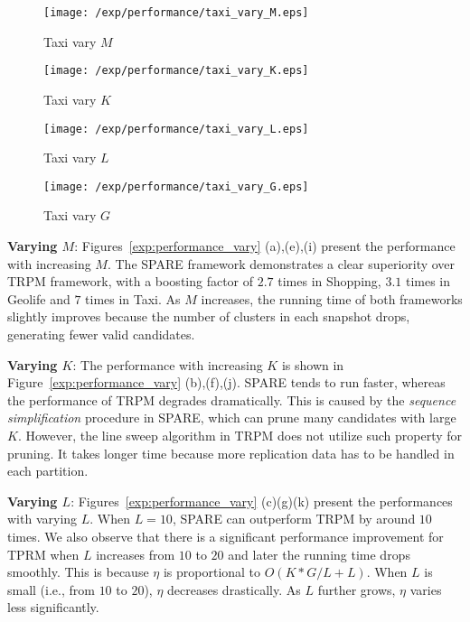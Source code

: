 \begin{figure*}[t]
    \begin{subfigure}[b]{0.23\textwidth}
        \texttt{[image: /exp/performance/taxi\_vary\_M.eps]}
        \caption{Taxi vary $M$}
    \end{subfigure}
    \begin{subfigure}[b]{0.23\textwidth}
        \texttt{[image: /exp/performance/taxi\_vary\_K.eps]}
        \caption{Taxi vary $K$}
    \end{subfigure}
    \begin{subfigure}[b]{0.23\textwidth}
        \texttt{[image: /exp/performance/taxi\_vary\_L.eps]}
        \caption{Taxi vary $L$}
    \end{subfigure}
       \begin{subfigure}[b]{0.23\textwidth}
        \texttt{[image: /exp/performance/taxi\_vary\_G.eps]}
        \caption{Taxi vary $G$}
    \end{subfigure}       
\caption{Performance of SPARE and TRPM on real datasets under different pattern parameters.}
\label{exp:performance_vary}
\end{figure*}
\textbf{Varying $M$}: Figures~\ref{exp:performance_vary} (a),(e),(i)
present the performance with increasing $M$. The SPARE framework demonstrates a clear superiority over TRPM framework, with a boosting factor of  $2.7$ times in Shopping, $3.1$ times in Geolife and
$7$ times in Taxi. As $M$ increases, the running time of both frameworks slightly improves because the number of clusters in each snapshot drops, generating fewer valid candidates.

\textbf{Varying $K$}: The performance with increasing $K$ is shown in Figure~\ref{exp:performance_vary} (b),(f),(j).  SPARE tends to run faster, whereas the performance of TRPM degrades dramatically. This is caused by the \emph{sequence simplification} procedure in SPARE, which can prune many candidates with large $K$. However, the line sweep algorithm in TRPM does not utilize such property for pruning. It takes longer time because more replication data has to be handled in each partition.

\textbf{Varying $L$}: Figures~\ref{exp:performance_vary} (c)(g)(k) present the performances with varying $L$. When $L=10$, SPARE can outperform TRPM by around $10$ times. We also observe that there is a significant performance improvement for TPRM when $L$ increases from $10$ to $20$ and later the running time drops smoothly. 
This is because $\eta$ is proportional to $O(K*G/L+L)$. When $L$ is small (i.e., from $10$ to $20$),
$\eta$ decreases drastically. As $L$ further grows, $\eta$ varies less significantly.

